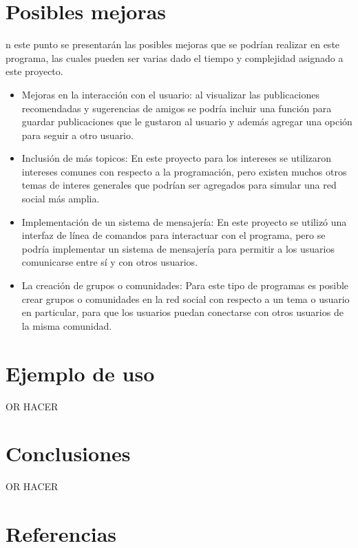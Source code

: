 \documentclass[9pt,letterpaper,onecolumn]{rho-class/rho}
\begin{document}
\newpage
\section{Posibles mejoras}

    n este punto se presentarán las posibles mejoras que se podrían realizar en este programa, las cuales pueden ser varias dado el tiempo y complejidad asignado a este proyecto.

    \begin{itemize}
        \item Mejoras en la interacción con el usuario: al visualizar las publicaciones recomendadas y sugerencias de amigos se podría incluir una función para guardar publicaciones que le gustaron al usuario y además agregar una opción para seguir a otro usuario.
        \vspace{0.3cm}
        \item Inclusión de más topicos: En este proyecto para los intereses se utilizaron intereses comunes con respecto a la programación, pero existen muchos otros temas de interes generales que podrían ser agregados para simular una red social más amplia.
        \vspace{0.3cm}
        \item Implementación de un sistema de mensajería: En este proyecto se utilizó una interfaz de línea de comandos para interactuar con el programa, pero se podría implementar un sistema de mensajería para permitir a los usuarios comunicarse entre sí y con otros usuarios.
        \vspace{0.3cm}
        \item La creación de grupos o comunidades: Para este tipo de programas es posible crear grupos o comunidades en la red social con respecto a un tema o usuario en particular, para que los usuarios puedan conectarse con otros usuarios de la misma comunidad.
    \end{itemize}

\newpage
\section{Ejemplo de uso}

    OR HACER

\newpage
\section{Conclusiones}

    OR HACER


\newpage
\section{Referencias}


\end{document}
